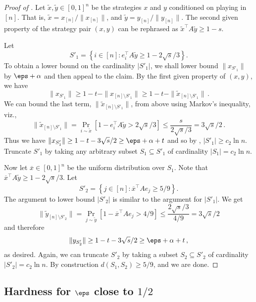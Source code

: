 %
%
%
%
%
%
%
%
%
%

\begin{proof}[Proof of ]
  Let $\tilde{x}, \tilde{y} \in [0,1]^n$ be the strategies $x$ and $y$
  conditioned on playing in $[n]$.  That is,
  $\tilde{x}=x_{[n]}/\|x_{[n]}\|$, and
  $\tilde{y}=y_{[n]}/\|y_{[n]}\|$.  The second given property of the
  strategy pair $(x,y)$ can be rephrased as $\tilde{x}^{\top} A
  \tilde{y} \ge 1-s$.
  
  Let
  $$S'_1 = \left\{ i \in [n]: e_i^{\top} A \tilde{y} \ge
  1-2\sqrt{s}/3\right\}.$$ To obtain a lower bound on the cardinality $|S'_1|$, we shall lower bound
  $\|x_{S'_1}\|$ by $\eps + \alpha$ and then appeal to the claim.  By the first given property of $(x,y)$, we have 
  $$\|x_{S'_1}\| \ge 1-t - \|x_{[n] \setminus S'_1}\| \ge 1 - t - \|\tilde{x}_{[n]\setminus  S'_1}\|\,.$$
  We can bound the last term, $\|\tilde{x}_{[n] \setminus S'_1}\|$, from above using Markov's inequality, viz.,
  $$
  \|\tilde{x}_{[n] \setminus S'_1}\| = \Pr_{i \sim \tilde{x}}\left[1 - e_i^{\top} A \tilde{y} > 2\sqrt{s} /3\right] \le \frac{s}{2 \sqrt{s} / 3} = 3\sqrt{s}/2\,.
  $$ Thus we have $\|x_{S'_1}\| \ge 1 - t - 3\sqrt{s}/2 \ge \eps +
  \alpha + t$ and so by , $|S'_1| \ge c_2 \ln n$.  Truncate $S'_1$
  by taking any arbitrary subset $S_1\subseteq S'_1$ of cardinality
  $|S_1|=c_2 \ln n$.
  
  Now let $\overline{x} \in [0,1]^n$ be the uniform distribution over
  $S_1$.  Note that $\overline{x}^{\top} A \tilde{y} \ge
  1-2\sqrt{s}/3$.  Let
  $$
  S'_2 = \left\{j \in [n]: \overline{x}^{\top} A e_j \ge 5/9\right\}.
  $$ The argument to lower bound $|S'_2|$ is similar to the argument
  for $|S'_1|$.  We get
  $$
  \|\tilde{y}_{[n] \setminus S'_2}\| = \Pr_{j \sim \tilde{y}}\left[1 - \overline{x}^{\top} A e_j > 4/9\right] \le \frac{2 \sqrt{s}/3}{4/9} = 3\sqrt{s}/2
  $$
  and therefore
  $$\|y_{S'_2}\| \ge 1 - t - 3 \sqrt{s}/2 \ge \eps + \alpha + t\,,$$
  as desired.  Again, we can truncate $S'_2$ by taking a subset $S_2\subseteq S'_2$ of cardinality $|S'_2|=c_2\ln n$. By construction $d(S_1, S_2) \ge 5/9$, and we are done.
%
\end{proof}


\subsection{\texorpdfstring{Hardness for $\eps$ close to $1/2$}{Hardness for epsilon close to 1/2}}\label{sec:eps-hardness}

